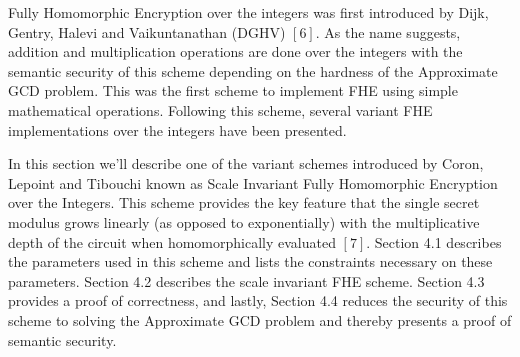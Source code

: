 \documentclass[../../main.tex]{subfiles}
\begin{document}
Fully Homomorphic Encryption over the integers was first introduced by Dijk, Gentry, Halevi and Vaikuntanathan (DGHV) $[6]$. As the name suggests, addition and multiplication operations are done over the integers with the semantic security of this scheme depending on the hardness of the Approximate GCD problem. This was the first scheme to implement FHE using simple mathematical operations. Following this scheme, several variant FHE implementations over the integers have been presented. 

In this section we'll describe one of the variant schemes introduced by Coron, Lepoint and Tibouchi known as Scale Invariant Fully Homomorphic Encryption over the Integers. This scheme provides the key feature that the single secret modulus grows linearly (as opposed to exponentially) with the multiplicative depth of the circuit when homomorphically evaluated $[7]$. Section 4.1 describes the parameters used in this scheme and lists the constraints necessary on these parameters. Section 4.2 describes the scale invariant FHE scheme. Section 4.3 provides a proof of correctness, and lastly, Section 4.4 reduces the security of this scheme to solving the Approximate GCD problem and thereby presents a proof of semantic security. 
\end{document}
